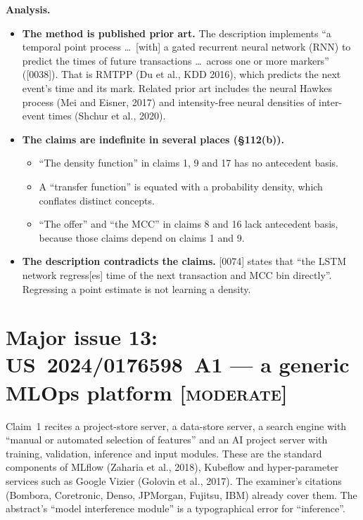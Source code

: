 \documentclass[10pt,a4paper]{article}
\newcommand{\sev}[1]{\textsc{\color{BrickRed}[#1]}}
\begin{document}
\noindent\textbf{Analysis.}
\begin{itemize}
  \item \textbf{The method is published prior art.} The description implements ``a temporal point process \ldots\ [with] a gated recurrent neural network (RNN) to predict the times of future transactions \ldots\ across one or more markers'' ([0038]). That is RMTPP (Du et al., KDD 2016), which predicts the next event's time and its mark. Related prior art includes the neural Hawkes process (Mei and Eisner, 2017) and intensity-free neural densities of inter-event times (Shchur et al., 2020).
  \item \textbf{The claims are indefinite in several places (\S112(b)).}
  \begin{itemize}
    \item ``The density function'' in claims 1, 9 and 17 has no antecedent basis.
    \item A ``transfer function'' is equated with a probability density, which conflates distinct concepts.
    \item ``The offer'' and ``the MCC'' in claims 8 and 16 lack antecedent basis, because those claims depend on claims 1 and 9.
  \end{itemize}
  \item \textbf{The description contradicts the claims.} [0074] states that ``the LSTM network regress[es] time of the next transaction and MCC bin directly''. Regressing a point estimate is not learning a density.
\end{itemize}

\section{Major issue 13: US~2024/0176598~A1 --- a generic MLOps platform \sev{moderate}}\label{sec:automl}
Claim~1 recites a project-store server, a data-store server, a search engine with ``manual or automated selection of features'' and an AI project server with training, validation, inference and input modules. These are the standard components of MLflow (Zaharia et al., 2018), Kubeflow and hyper-parameter services such as Google Vizier (Golovin et al., 2017). The examiner's citations (Bombora, Coretronic, Denso, JPMorgan, Fujitsu, IBM) already cover them. The abstract's ``model interference module'' is a typographical error for ``inference''.

\end{document}
